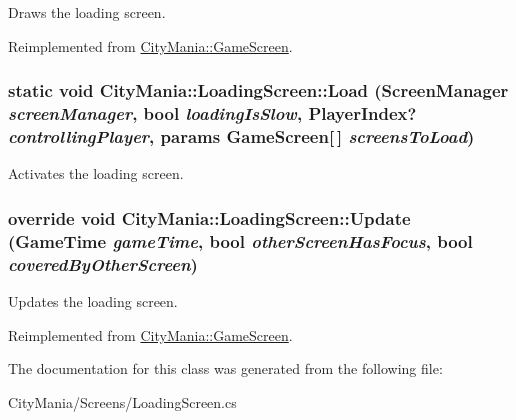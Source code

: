 Draws the loading screen. 

Reimplemented from \hyperlink{classCityMania_1_1GameScreen_a28fbcdba21da5e606d32d87b18bcdf29}{CityMania::GameScreen}.\hypertarget{classCityMania_1_1LoadingScreen_ae5ce36d16153b9cf72df2d4b199a5e29}{
\subsubsection[{Load}]{\setlength{\rightskip}{0pt plus 5cm}static void CityMania::LoadingScreen::Load ({\bf ScreenManager} {\em screenManager}, \/  bool {\em loadingIsSlow}, \/  PlayerIndex? {\em controllingPlayer}, \/  params {\bf GameScreen}\mbox{[}$\,$\mbox{]} {\em screensToLoad})}}
\label{classCityMania_1_1LoadingScreen_ae5ce36d16153b9cf72df2d4b199a5e29}


Activates the loading screen. \hypertarget{classCityMania_1_1LoadingScreen_a587d8f5feaeb84a674f1102dfdb723d4}{
\subsubsection[{Update}]{\setlength{\rightskip}{0pt plus 5cm}override void CityMania::LoadingScreen::Update (GameTime {\em gameTime}, \/  bool {\em otherScreenHasFocus}, \/  bool {\em coveredByOtherScreen})}}
\label{classCityMania_1_1LoadingScreen_a587d8f5feaeb84a674f1102dfdb723d4}


Updates the loading screen. 

Reimplemented from \hyperlink{classCityMania_1_1GameScreen_a7f0d5b33eca521dc7fcd89eec337ccf9}{CityMania::GameScreen}.

The documentation for this class was generated from the following file:\begin{DoxyCompactItemize}
\item 
CityMania/Screens/LoadingScreen.cs\end{DoxyCompactItemize}
